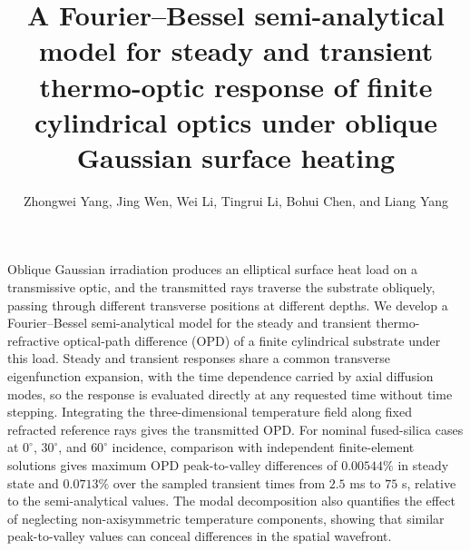 \documentclass{optica-article}
\begin{document}
\title{A Fourier--Bessel semi-analytical model for steady and transient thermo-optic response of finite cylindrical optics under oblique Gaussian surface heating}
\author{Zhongwei Yang, Jing Wen, Wei Li, Tingrui Li, Bohui Chen, and Liang Yang}
\address{School of Mathematics, Southwest Jiaotong University, Chengdu 611756, China\\
Laser Fusion Research Center, CAEP, Mianyang 621900, China\\
Institute of Laser \& Micro-Nano Engineering, College of Electronics \& Information Engineering, Sichuan University, Chengdu 610065, China\\
College of Mathematics, Sichuan University, Chengdu 610064, China}
\begin{abstract*}
Oblique Gaussian irradiation produces an elliptical surface heat load on a transmissive optic, and the transmitted rays traverse the substrate obliquely, passing through different transverse positions at different depths.
We develop a Fourier--Bessel semi-analytical model for the steady and transient thermo-refractive optical-path difference (OPD) of a finite cylindrical substrate under this load.
Steady and transient responses share a common transverse eigenfunction expansion, with the time dependence carried by axial diffusion modes, so the response is evaluated directly at any requested time without time stepping.
Integrating the three-dimensional temperature field along fixed refracted reference rays gives the transmitted OPD.
For nominal fused-silica cases at $0^\circ$, $30^\circ$, and $60^\circ$ incidence, comparison with independent finite-element solutions gives maximum OPD peak-to-valley differences of $0.00544\%$ in steady state and $0.0713\%$ over the sampled transient times from $2.5$ ms to $75$ s, relative to the semi-analytical values.
The modal decomposition also quantifies the effect of neglecting non-axisymmetric temperature components, showing that similar peak-to-valley values can conceal differences in the spatial wavefront.

\end{abstract*}
\end{document}
